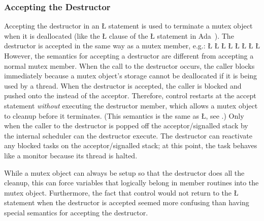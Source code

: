 \documentclass[openright,twoside]{report}
\begin{document}
\subsubsection{Accepting the Destructor}
\label{s:AcceptingDestructor}

Accepting the destructor in an \LGinlinetrue\LGbegin\lgrinde\L{}\endlgrinde\LGend{} statement is used to terminate a mutex object when it is deallocated (like the \LGinlinetrue\LGbegin\lgrinde\L{}\endlgrinde\LGend{} clause of the \LGinlinetrue\LGbegin\lgrinde\L{}\endlgrinde\LGend{} statement in Ada~\cite[Sections 9.4, 9.7.1]{Ada}).
The destructor is accepted in the same way as a mutex member, e.g.:
\LGinlinefalse\LGbegin\lgrinde
\L{}
\L{\LB{}}
\CE{}\L{\LB{}}
\L{\LB{}}
\CE{}\L{\LB{}}
\CE{}\L{\LB{}}
\CE{}\L{\LB{\}}}
\L{}
\CE{}\endlgrinde\LGend
However, the semantics for accepting a destructor are different from accepting a normal mutex member.
When the call to the destructor occurs, the caller blocks immediately because a mutex object's storage cannot be deallocated if it is being used by a thread.
When the destructor is accepted, the caller is blocked and pushed onto the  instead of the acceptor.
Therefore, control restarts at the accept statement \emph{without} executing the destructor member, which allows a mutex object to cleanup before it terminates.
(This semantics is the same as \LGinlinetrue\LGbegin\lgrinde\L{}\endlgrinde\LGend{}, see .)
Only when the caller to the destructor is popped off the acceptor/signalled stack by the internal scheduler can the destructor execute.
The destructor can reactivate any blocked tasks on the acceptor/signalled stack;
at this point, the task behaves like a monitor because its thread is halted.

\begin{annotation}
While a mutex object can always be setup so that the destructor does all the cleanup, this can force variables that logically belong in member routines into the mutex object.
Furthermore, the fact that control would not return to the \LGinlinetrue\LGbegin\lgrinde\L{}\endlgrinde\LGend{} statement when the destructor is accepted seemed more confusing than having special semantics for accepting the destructor.
\end{annotation}
\end{document}
